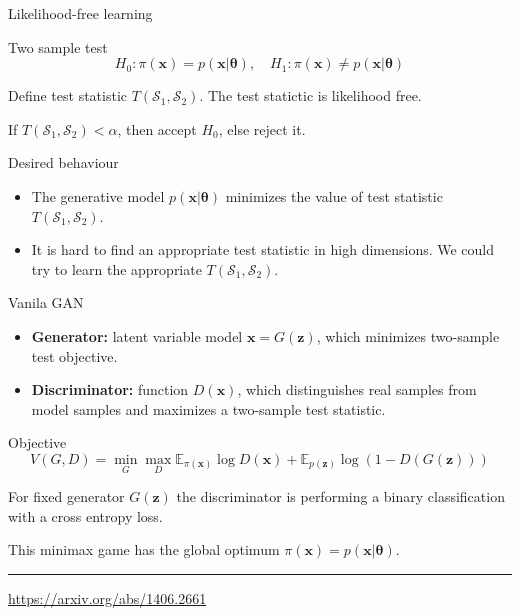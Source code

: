 \documentclass{beamer}
\newcommand{\bx}{\mathbf{x}}
\newcommand{\bz}{\mathbf{z}}
\newcommand{\bbE}{\mathbb{E}}
\newcommand{\cS}{\mathcal{S}}
\newcommand{\btheta}{\boldsymbol{\theta}}
\begin{document}
\begin{frame}{Likelihood-free learning}
		\begin{block}{Two sample test}
			\vspace{-0.3cm}
			\[
				H_0: \pi(\bx) = p(\bx | \btheta), \quad H_1: \pi(\bx) \neq p(\bx | \btheta)
			\]
	\end{block}
	Define test statistic $T(\cS_1, \cS_2)$. The test statictic is likelihood free.
	
	If $T(\cS_1, \cS_2) < \alpha$, then accept $H_0$, else reject it.
	
	\begin{block}{Desired behaviour}
		\begin{itemize}
			\item The generative model $p(\bx | \btheta)$ minimizes the value of test statistic~$T(\cS_1, \cS_2)$.
			\item It is hard to find an appropriate test statistic in high dimensions. We could try to learn the appropriate $T(\cS_1, \cS_2)$.
		\end{itemize}
	\end{block}
\end{frame}
\begin{frame}{Vanila GAN}
	\begin{itemize}
		\item \textbf{Generator:} latent variable model $\bx = G(\bz)$, which minimizes two-sample test objective.
		\item \textbf{Discriminator:} function $D(\bx)$, which distinguishes real samples from model samples and maximizes a two-sample test statistic.
	\end{itemize}
	\begin{block}{Objective}
		\[
			V(G, D) = \min_{G} \max_D \bbE_{\pi(\bx)} \log D(\bx) + \bbE_{p(\bz)} \log (1 - D(G(\bz)))
		\]
	\end{block}
	For fixed generator $G(\bz)$ the discriminator is performing a binary classification with a cross entropy loss.
	
	 This minimax game has the global optimum $\pi(\bx) = p(\bx | \btheta)$.
	 \vfill
	 \hrule\medskip
	 {\scriptsize \href{https://arxiv.org/abs/1406.2661}{https://arxiv.org/abs/1406.2661}}
\end{frame}
\end{document}
